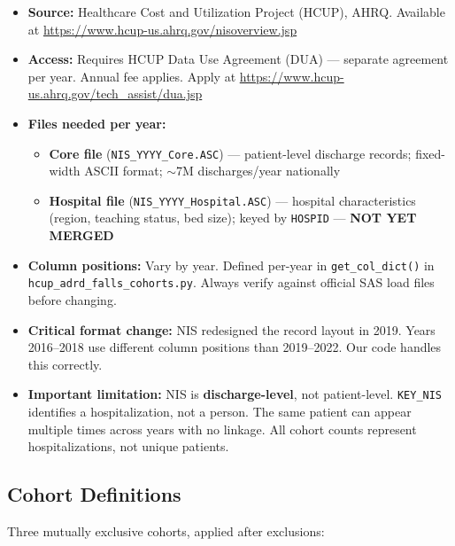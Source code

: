 \documentclass[11pt,letterpaper]{article}
\begin{document}
\begin{tcolorbox}[colback=warnred!8, colframe=warnred,
  title=\textbf{Dataset: HCUP National Inpatient Sample (NIS), 2016–2022}]
\begin{itemize}
  \item \textbf{Source:} Healthcare Cost and Utilization Project (HCUP), AHRQ.
        Available at \url{https://www.hcup-us.ahrq.gov/nisoverview.jsp}
  \item \textbf{Access:} Requires HCUP Data Use Agreement (DUA) — separate agreement
        per year. Annual fee applies. Apply at \url{https://www.hcup-us.ahrq.gov/tech_assist/dua.jsp}
  \item \textbf{Files needed per year:}
    \begin{itemize}
      \item \textbf{Core file} (\texttt{NIS\_YYYY\_Core.ASC}) — patient-level discharge
            records; fixed-width ASCII format; $\sim$7M discharges/year nationally
      \item \textbf{Hospital file} (\texttt{NIS\_YYYY\_Hospital.ASC}) — hospital
            characteristics (region, teaching status, bed size); keyed by \texttt{HOSPID}
            — \textbf{NOT YET MERGED}
    \end{itemize}
  \item \textbf{Column positions:} Vary by year. Defined per-year in
        \texttt{get\_col\_dict()} in \texttt{hcup\_adrd\_falls\_cohorts.py}.
        Always verify against official SAS load files before changing.
  \item \textbf{Critical format change:} NIS redesigned the record layout in 2019.
        Years 2016–2018 use different column positions than 2019–2022.
        Our code handles this correctly.
  \item \textbf{Important limitation:} NIS is \textbf{discharge-level}, not
        patient-level. \texttt{KEY\_NIS} identifies a hospitalization, not a person.
        The same patient can appear multiple times across years with no linkage.
        All cohort counts represent hospitalizations, not unique patients.
\end{itemize}
\end{tcolorbox}

\subsection{Cohort Definitions}

Three mutually exclusive cohorts, applied after exclusions:
\end{document}
